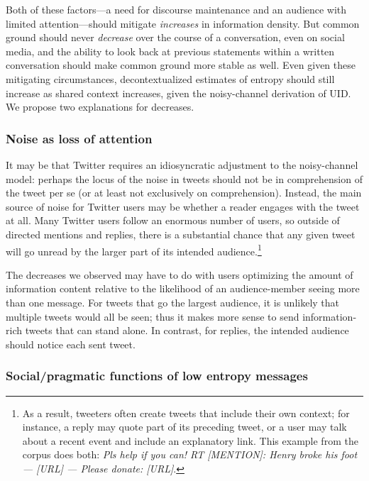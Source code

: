 \documentclass[11pt,letterpaper]{article}
\begin{document}
Both of these factors---a need for discourse maintenance and an audience with limited attention---should mitigate \emph{increases} in information density. But common ground should never \emph{decrease} over the course of a conversation, even on social media, and the ability to look back at previous statements within a written conversation should make common ground more stable as well. Even given these mitigating circumstances, decontextualized estimates of entropy should still increase as shared context increases, given the noisy-channel derivation of UID. We propose two explanations for decreases. 

\subsubsection{Noise as loss of attention}

It may be that Twitter requires an idiosyncratic adjustment to the noisy-channel model: perhaps the locus of the noise in tweets should not be in comprehension of the tweet per se (or at least not exclusively on comprehension). Instead, the main source of noise for Twitter users may be whether a reader engages with the tweet at all. Many Twitter users follow an enormous number of users, so outside of directed mentions and replies, there is a substantial chance that any given tweet will go unread by the larger part of its intended audience.\footnote{As a result, tweeters often create tweets that include their own context; for instance, a reply may quote part of its preceding tweet, or a user may talk about a recent event and include an explanatory link. This example from the corpus does both: {\it Pls help if you can! RT [MENTION]: Henry broke his foot — [URL] — Please donate: [URL]}.}

The decreases we observed may have to do with users optimizing the amount of information content relative to the likelihood of an audience-member seeing more than one message. For tweets that go the largest audience, it is unlikely that multiple tweets would all be seen; thus it makes more sense to send information-rich tweets that can stand alone. In contrast, for replies, the intended audience should notice each sent tweet. 

\subsubsection{Social/pragmatic functions of low entropy messages}
\end{document}
